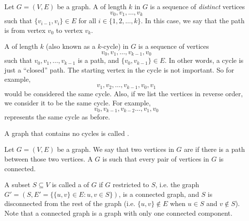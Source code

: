 \begin{definition} \label{definition:Paths-and-cycles}
Let $G=(V,E)$ be a graph. A  of length $k$ in $G$ is a sequence of \emph{distinct} vertices $$v_0,v_1,\ldots,v_k$$ such that $\{v_{i-1}, v_i\} \in E$ for all $i \in \{1,2,\ldots,k\}$. In this case, we say that the path is from vertex $v_0$ to vertex $v_k$.

A  of length $k$ (also known as a $k$-cycle) in $G$ is a sequence of vertices $$v_0, v_1, \ldots, v_{k-1}, v_0$$ such that $v_0, v_1, \ldots, v_{k-1}$ is a path, and $\{v_0,v_{k-1}\} \in E$. In other words, a cycle is just a ``closed'' path. The starting vertex in the cycle is not important. So for example,
$$v_1, v_2, \ldots, v_{k-1},v_0,v_1$$
would be considered the same cycle. Also, if we list the vertices in reverse order, we consider it to be the same cycle. For example, 
$$v_0, v_{k-1}, v_{k-2} \ldots, v_1, v_0$$
represents the same cycle as before.

A graph that contains no cycles is called .
\end{definition}


\begin{definition} \label{definition:Connected-graph-connected-component}
Let $G = (V,E)$ be a graph. We say that two vertices in $G$ are  if there is a path between those two vertices. A  $G$ is such that every pair of vertices in $G$ is connected.

A subset $S \subseteq V$ is called a  of $G$ if $G$ restricted to $S$, i.e. the graph $G' = (S, E' = \{\{u,v\} \in E : u,v \in S\})$, is a connected graph, and $S$ is disconnected from the rest of the graph (i.e. $\{u,v\} \not \in E$ when $u \in S$ and $v \not \in S$). Note that a connected graph is a graph with only one connected component.
\end{definition}


